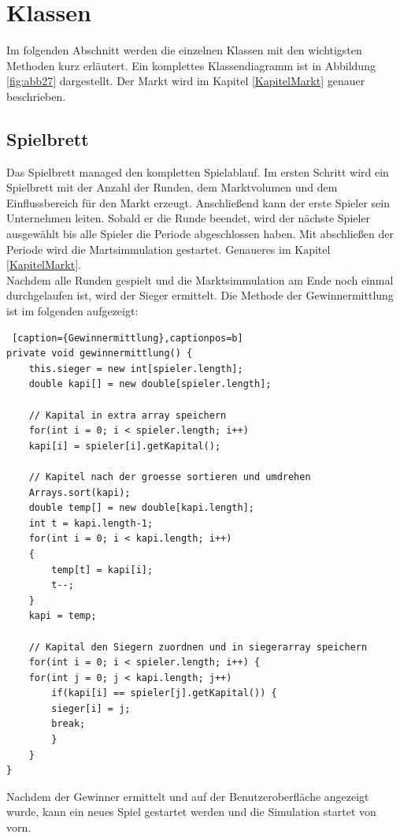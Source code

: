 \newpage
\section{Klassen}
Im folgenden Abschnitt werden die einzelnen Klassen mit den wichtigsten Methoden kurz erläutert. Ein komplettes Klassendiagramm ist in Abbildung \ref{fig:abb27} dargestellt. Der Markt wird im Kapitel \ref{KapitelMarkt} genauer beschrieben.

\subsection{Spielbrett}
Das Spielbrett managed den kompletten Spielablauf. Im ersten Schritt wird ein Spielbrett mit der Anzahl der Runden, dem Marktvolumen und dem Einflussbereich für den Markt erzeugt. Anschließend kann der erste Spieler sein Unternehmen leiten. Sobald er die Runde beendet, wird der nächste Spieler ausgewählt bis alle Spieler die Periode abgeschlossen haben. Mit abschließen der Periode wird die Martsimmulation gestartet. Genaueres im Kapitel \ref{KapitelMarkt}. \\
Nachdem alle Runden gespielt und die Marktsimmulation am Ende noch einmal durchgelaufen ist, wird der Sieger ermittelt. Die Methode der Gewinnermittlung ist im folgenden aufgezeigt: \\

\lstset{language=Java} 
\begin{lstlisting} [caption={Gewinnermittlung},captionpos=b]
private void gewinnermittlung() {
	this.sieger = new int[spieler.length];
	double kapi[] = new double[spieler.length];
	
	// Kapital in extra array speichern
	for(int i = 0; i < spieler.length; i++)
	kapi[i] = spieler[i].getKapital();
	
	// Kapitel nach der groesse sortieren und umdrehen		
	Arrays.sort(kapi);
	double temp[] = new double[kapi.length];
	int t = kapi.length-1;
	for(int i = 0; i < kapi.length; i++)
	{
		temp[t] = kapi[i];
		t--;
	}
	kapi = temp;
	
	// Kapital den Siegern zuordnen und in siegerarray speichern
	for(int i = 0; i < spieler.length; i++) {
	for(int j = 0; j < kapi.length; j++)
		if(kapi[i] == spieler[j].getKapital()) {
		sieger[i] = j;
		break;
		}
	}
}
\end{lstlisting}

Nachdem der Gewinner ermittelt und auf der Benutzeroberfläche angezeigt wurde, kann ein neues Spiel gestartet werden und die Simulation startet von vorn.

